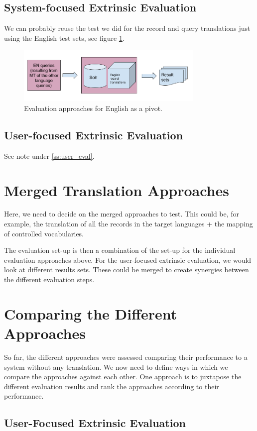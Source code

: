 \documentclass[a4paper,11pt]{article}
\begin{document}
\subsection{System-focused Extrinsic Evaluation}
We can probably reuse the test we did for the record and query translations just using the English test sets, see figure \ref{figpivot}. 


\begin{figure}
	\centering
  \includegraphics[width=0.8\textwidth]{./img/pivot_approach.png}
	\caption{Evaluation approaches for English as a pivot.}
	\label{figpivot}
\end{figure}

\subsection{User-focused Extrinsic Evaluation}

See note under \ref{ss:user_eval}.

\section{Merged Translation Approaches}
Here, we need to decide on the merged approaches to test. This could be, for example, the translation of all the records in the target languages + the mapping of controlled vocabularies. 

The evaluation set-up is then a combination of the set-up for the individual evaluation approaches above. For the user-focused extrinsic evaluation, we would look at different results sets. These could be merged to create synergies between the different evaluation steps.

\section{Comparing the Different Approaches}
So far, the different approaches were assessed comparing their performance to a system without any translation. We now need to define ways in which we compare the approaches against each other.
One approach is to juxtapose the different evaluation results and rank the approaches according to their performance. 

\subsection{User-Focused Extrinsic Evaluation}

%
%


\end{document}
